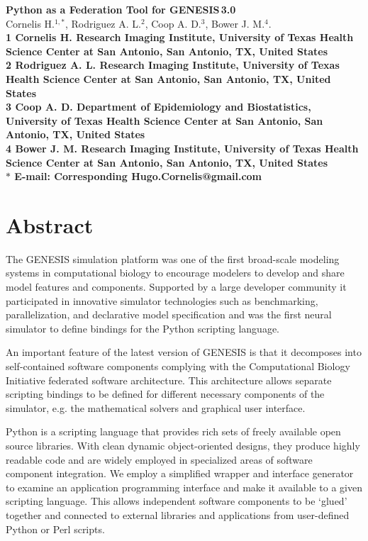 \documentclass[10pt]{article}
\date{}
\begin{document}
\begin{flushleft}
{\Large
\textbf{Python as a Federation Tool for GENESIS\,3.0}
}
\\
Cornelis H.$^{1,\ast}$, 
Rodriguez A. L.$^{2}$, 
Coop A. D.$^{3}$,
Bower J. M.$^{4}$.
\\
\bf{1} Cornelis H. Research Imaging Institute, University of Texas Health Science Center at San Antonio, San Antonio, TX, United States
\\
\bf{2} Rodriguez A. L. Research Imaging Institute, University of Texas Health Science Center at San Antonio, San Antonio, TX, United States
\\
\bf{3} Coop A. D. Department of Epidemiology and Biostatistics, University of Texas Health Science Center at San Antonio, San Antonio, TX, United States
\\
\bf{4} Bower J. M. Research Imaging Institute, University of Texas Health Science Center at San Antonio, San Antonio, TX, United States
\\
$\ast$ E-mail: Corresponding Hugo.Cornelis@gmail.com
\end{flushleft}

\section*{Abstract}

The GENESIS simulation platform was one of the first
broad-scale modeling systems in computational biology to encourage
modelers to develop and share model features and components.
Supported by a large developer community it
participated in innovative simulator technologies such as
benchmarking, parallelization, and declarative model specification and was the first neural simulator to define bindings for the Python scripting language.

An important feature of the latest version of GENESIS is
that it decomposes into self-contained software components
complying with the Computational Biology Initiative federated software
architecture.  This architecture allows separate scripting bindings to be
defined for different necessary components of the simulator, e.g. the mathematical solvers and graphical user interface.

Python is a scripting language that provides rich sets of
freely available open source libraries. With clean dynamic object-oriented
designs, they produce highly readable
code and are widely employed in specialized areas of
software component integration. We employ a simplified wrapper and interface generator to examine an application
programming interface and make it available to a given scripting
language.  This allows independent software components
to be `glued' together and connected to
external libraries and applications from user-defined Python or Perl scripts.
\end{document}
